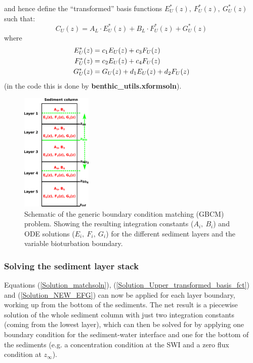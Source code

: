 \documentclass[gmd, manuscript]{copernicus}
\begin{document}
and hence define the ``transformed'' basis functions $E_U^*(z),\ F_U^*(z),\ G_U^*(z)$ such that:
\begin{equation}
 C_U(z) = A_L \cdot E_U^*(z) + B_L \cdot F_U^*(z) + G_U^*(z) \label{Solution_Upper_transformed_basis_fct}
\end{equation}
where
\begin{align}
 E_U^*(z) &= c_1 E_U(z) + c_3 F_U(z) \notag\\
 F_U^*(z) &= c_2 E_U(z) + c_4 F_U(z) \label{Solution_NEW_EFG}\\
 G_U^*(z) &= G_U(z) + d_1 E_U(z) + d_2 F_U(z) \notag
\end{align}
(in the code this is done by \textsf{\textbf{benthic\_utils.xformsoln}}).

\begin{figure}[htbp]
\begin{center}
	\includegraphics[width=0.3\textwidth]{figures/Boundary_Matching_zbio.pdf}
	\caption{Schematic of the generic boundary condition matching (GBCM) problem. Showing the resulting integration constants ($A_i,\ B_i$) and ODE solutions ($E_i,\ F_i,\ G_i$) for the different sediment layers and the variable 
	bioturbation boundary.}
	\label{fig:Boundary_matching_algo}
	\end{center}
\end{figure}

\subsubsection*{Solving the sediment layer stack}
Equations (\ref{Solution_matchsoln}), (\ref{Solution_Upper_transformed_basis_fct}) and (\ref{Solution_NEW_EFG}) can now be applied for each layer boundary, working up from the bottom of the sediments. 
The net result is a piecewise solution of the whole sediment column with just two integration constants (coming from the lowest layer), which can then be solved for by applying one boundary condition for the sediment-water interface 
and one for the bottom of the sediments (e.g. a concentration condition at the SWI and a zero flux condition at $z_\infty$). 
\end{document}
